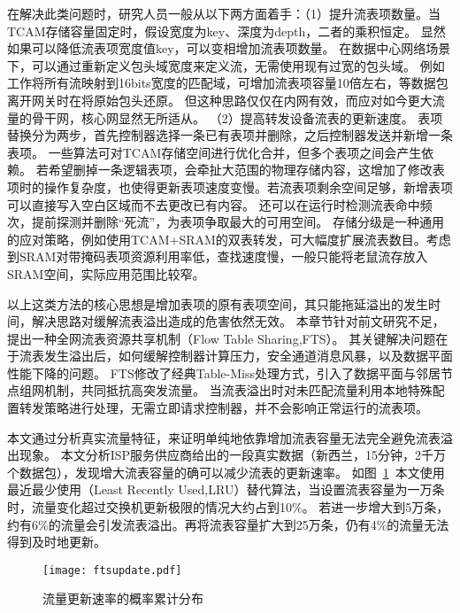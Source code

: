 在解决此类问题时，研究人员一般从以下两方面着手：（1）提升流表项数量。当TCAM存储容量固定时，假设宽度为key、深度为depth，二者的乘积恒定。
显然如果可以降低流表项宽度值key，可以变相增加流表项数量。
在数据中心网络场景下，可以通过重新定义包头域宽度来定义流，无需使用现有过宽的包头域。
例如工作将所有流映射到16bits宽度的匹配域，可增加流表项容量10倍左右，等数据包离开网关时在将原始包头还原。
但这种思路仅仅在内网有效，而应对如今更大流量的骨干网，核心网显然无所适从。
（2）提高转发设备流表的更新速度。
表项替换分为两步，首先控制器选择一条已有表项并删除，之后控制器发送并新增一条表项。
一些算法可对TCAM存储空间进行优化合并，但多个表项之间会产生依赖。
若希望删掉一条逻辑表项，会牵扯大范围的物理存储内容，这增加了修改表项时的操作复杂度，也使得更新表项速度变慢。若流表项剩余空间足够，新增表项可以直接写入空白区域而不去更改已有内容。
还可以在运行时检测流表命中频次，提前探测并删除“死流”，为表项争取最大的可用空间。
存储分级是一种通用的应对策略，例如使用TCAM+SRAM的双表转发，可大幅度扩展流表数目。考虑到SRAM对带掩码表项资源利用率低，查找速度慢，一般只能将老鼠流存放入SRAM空间，实际应用范围比较窄。

以上这类方法的核心思想是增加表项的原有表项空间，其只能拖延溢出的发生时间，解决思路对缓解流表溢出造成的危害依然无效。
本章节针对前文研究不足，提出一种全网流表资源共享机制（Flow Table Sharing,FTS）。
其关键解决问题在于流表发生溢出后，如何缓解控制器计算压力，安全通道消息风暴，以及数据平面性能下降的问题。
FTS修改了经典Table-Miss处理方式，引入了数据平面与邻居节点组网机制，共同抵抗高突发流量。
当流表溢出时对未匹配流量利用本地特殊配置转发策略进行处理，无需立即请求控制器，并不会影响正常运行的流表项。



\label{chap53}

本文通过分析真实流量特征，来证明单纯地依靠增加流表容量无法完全避免流表溢出现象。
本文分析ISP服务供应商给出的一段真实数据（新西兰，15分钟，2千万个数据包），发现增大流表容量的确可以减少流表的更新速率。
如图~\ref{fig:ftsupdate}~本文使用最近最少使用（Least Recently Used,LRU）替代算法，当设置流表容量为一万条时，流量变化超过交换机更新极限的情况大约占到10\%。
若进一步增大到5万条，约有6\%的流量会引发流表溢出。再将流表容量扩大到25万条，仍有4\%的流量无法得到及时地更新。

\begin{figure}[!ht]
	\centering 
	\vspace{-1.5mm} 
	\texttt{[image: ftsupdate.pdf]}
	\caption{流量更新速率的概率累计分布} \label{fig:ftsupdate}
\end{figure}

